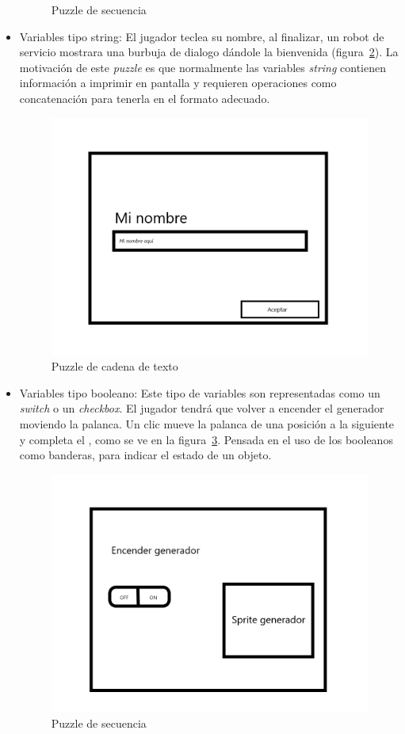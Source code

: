 \begin{itemize}
\begin{figure}[H]
        \caption{Puzzle de secuencia}
        \label{fig:puzzle_secuencia}
    \end{figure}
    \item Variables tipo string: El jugador teclea su nombre, al finalizar, un robot de servicio mostrara una burbuja de dialogo dándole la bienvenida (figura~\ref{fig:puzzle_string}). La motivación de este \textit{puzzle} es que normalmente las variables \textit{string} contienen información a imprimir en pantalla y requieren operaciones como concatenación para tenerla en el formato adecuado.
        \begin{figure}[H]
        \centering
        \includegraphics[width=0.5\linewidth]{images/PuzzleString.png}
        \caption{Puzzle de cadena de texto}
        \label{fig:puzzle_string}
    \end{figure}
    \item  Variables tipo booleano: Este tipo de variables son representadas como un \textit{switch} o un \textit{checkbox}. El jugador tendrá que volver a encender el generador moviendo la palanca. Un clic mueve la palanca de una posición a la siguiente y completa el , como se ve en la figura~\ref{fig:puzzle_booleano}. Pensada en el uso de los booleanos como  banderas, para indicar el estado de un objeto. 
    \begin{figure}[H]
        \centering
        \includegraphics[width=0.5\linewidth]{images/SabotageGenerador.png}
        \caption{Puzzle de secuencia}
        \label{fig:puzzle_booleano}
    \end{figure}

\end{itemize}
